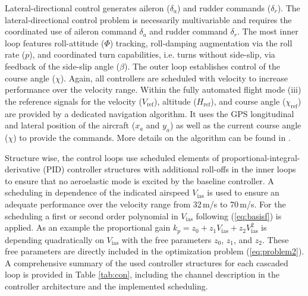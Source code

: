 \documentclass[aerospace,article,submit,moreauthors,pdftex,10pt,a4paper]{Definitions/mdpi}
\begin{document}
Lateral-directional control generates aileron ($\delta_a$) and rudder commands ($\delta_r$). 
The lateral-directional control problem is necessarily multivariable and requires the coordinated use of aileron command $\delta_{a}$ and rudder command $\delta_{r}$. The most inner loop features roll-attitude ($\Phi$) tracking, roll-damping augmentation via the roll rate ($p$), and coordinated turn capabilities, i.e. turns without side-slip, via feedback of the side-slip angle ($\beta$). The outer loop establishes control of the course angle ($\chi$). Again, all controllers are scheduled with velocity to increase performance over the velocity range. Within the fully automated flight mode (iii) the reference signals for the velocity ($V_\text{ref}$), altitude ($H_\text{ref}$), and course angle ($\chi_\text{ref}$) are provided by a dedicated navigation algorithm. It uses the GPS longitudinal and lateral position of the aircraft ($x_a$ and $y_a$) as well as the current course angle  ($\chi$) to provide the commands.  More details on the algorithm can be found in \cite{Ossmann19a}.


Structure wise, the control loops use scheduled elements of proportional-integral-derivative (PID) controller structures with additional roll-offs in the inner loops to ensure that no aeroelastic mode is excited by the baseline controller. A scheduling in dependence of the indicated airspeed $V_{\text{ias}}$ is used to ensure an adequate performance over the velocity range from 32\,m/s to 70\,m/s. For the scheduling a first or second order polynomial in  $V_{\text{ias}}$ following (\ref{eq:basisf}) is applied. As an example the proportional gain $k_p = z_0 + z_1 V_{\text{ias}} + z_2 V^2_{\text{ias}}$ is depending quadratically on  $V_{\text{ias}}$ with the free parameters $z_0$, $z_1$, and $z_2$. These free parameters are directly included in the optimization problem (\ref{eq:problem2}). A comprehensive summary of the used controller structures for each cascaded  loop is provided in Table \ref{tab:con}, including the channel description in the controller architecture and the implemented scheduling. 
\end{document}
